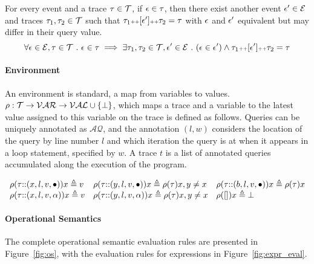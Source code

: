   \begin{coro}
  \label{coro:aqintrace}
  For every event and a trace $\mathtt{\tau} \in \mathcal{T}$,
  if $\mathtt{\epsilon} \in \mathtt{\tau}$, 
  then there exist another event $\mathtt{\epsilon}' \in \mathcal{E}$ and traces $\mathtt{\tau}_1, \mathtt{\tau}_2 \in \mathcal{T}$
  such that $\mathtt{\tau}_1 {\scriptscriptstyle ++} [\mathtt{\epsilon}'] {\scriptscriptstyle ++} \mathtt{\tau}_2 = \mathtt{\tau} $
  with 
  $\mathtt{\epsilon}$ and $\mathtt{\epsilon}'$ equivalent but may differ in their query value.
  \[
    \forall \mathtt{\epsilon} \in \mathcal{E}, \mathtt{\tau} \in \mathcal{T} ~.~ 
  \mathtt{\epsilon} \in \mathtt{\tau} \implies \exists \mathtt{\tau}_1, \mathtt{\tau}_2 \in \mathcal{T}, 
  \mathtt{\epsilon}' \in \mathcal{E} ~.~ (\mathtt{\epsilon} \in \mathtt{\epsilon}') \land \mathtt{\tau}_1 {\scriptscriptstyle ++} [\mathtt{\epsilon}'] {\scriptscriptstyle ++} \mathtt{\tau}_2 = \mathtt{\tau}  
  \]
  \end{coro}
%  
\paragraph{Environment}
An environment is standard, a map from variables to values.
$\rho : {\mathcal{T}}  \to \mathcal{VAR} \to \mathcal{VAL} \cup \{\bot\}$, 
which maps a trace and a variable to the latest value assigned to this variable on the trace is defined as follows.
Queries can be uniquely annotated as $\mathcal{AQ}$, and the annotation $(l,w)$ considers the location of the query by line number $l$ and which 
iteration the query is at when it appears in a loop statement, specified by $w$. A trace $t$ is a list of annotated queries accumulated along the execution of the program. 

\[
\begin{array}{lll}
\rho(\mathtt{\tau}  {\small ::} (x, l, v, \bullet)) x \triangleq v
&
\rho(\mathtt{\tau} {\small ::} (y, l, v, \bullet)) x \triangleq \rho(\mathtt{\tau}) x, y \neq x
&
\rho(\mathtt{\tau} {\small ::} (b, l, v, \bullet)) x \triangleq \rho(\mathtt{\tau}) x
\\
\rho(\mathtt{\tau} {\small ::} (x, l, v, \alpha)) x \triangleq v
&
\rho(\mathtt{\tau} {\small ::} (y, l, v, \alpha)) x \triangleq \rho(\mathtt{\tau}) x, y \neq x
&
\rho({[]} ) x \triangleq \bot
\end{array}
\]

 \paragraph*{Operational Semantics}
 The complete operational semantic evaluation rules are presented in Figure~\ref{fig:os},
 with the evaluation rules for expressions in Figure~\ref{fig:expr_eval}.

